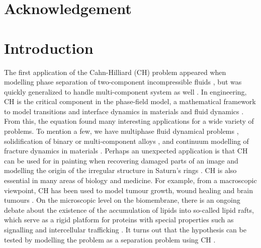 \documentclass[11pt]{article}
\theoremstyle{remark}
\numberwithin{equation}{section}
\begin{document}
\newpage
\section*{Acknowledgement}%
\label{sec:acknowledgement}

\newpage
\section{Introduction}\label{sec:introduction}


The first application of the Cahn-Hilliard (CH) problem appeared when modelling phase separation of two-component incompressible fluids \cite{cahn1958free, cahn1959free, cahn1961spinodal}, but was quickly generalized to handle multi-component system
as well \cite{bosch2015fractional, eyre1993systems, toth2016phase, miranville2017cahn}. In engineering, CH is the critical component in
the phase-field model, a mathematical framework to model transitions and interface dynamics in materials and fluid dynamics \cite{steinbach2009phase, chen2002phase}.
From this, the equation found many interesting applications for a wide variety of problems. To mention a few, we have
multiphase fluid dynamical problems \cite{badalassi2003computation, li2016lattice, kim2012phase, shen2010phase}, solidification of binary or multi-component alloys \cite{kim1999phase, echebarria2004quantitative}, and continuum modelling of fracture dynamics in
materials \cite{kuhn2010continuum, li2015phase}. Perhaps an unexpected application is that CH can be used for in painting when recovering damaged parts of an image \cite{bertozzi2006inpainting, burger2009cahn, bosch2015fractional, brkic2020image}
and modelling the origin of the irregular structure in Saturn's rings \cite{tremaine2003origin}.
CH is also essential in many areas of biology and medicine. For example, from a macroscopic viewpoint, CH has been used to model tumour growth, wound healing and brain tumours \cite{agosti2017cahn, cristini2009nonlinear}.
On the microscopic level on the biomembrane, there is an ongoing debate about the existence of the accumulation of lipids into so-called lipid rafts, which serve as a rigid platform for proteins with
special properties such as signalling and intercellular trafficking \cite{ levental2020lipid, hancock2006lipid, munro2003lipid, simons1997functional}. It turns out that the hypothesis can be tested by modelling the problem as a separation problem using
CH \cite{miller2020divide, garcke2016coupled, yushutin2019computational}.
\end{document}
